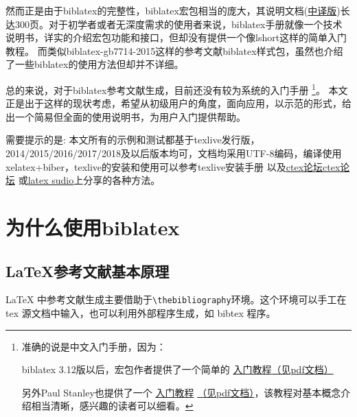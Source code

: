 \documentclass[twoside]{article} %
\begin{document}
然而正是由于biblatex的完整性，biblatex宏包相当的庞大，其说明文档(\href{https://github.com/hushidong/biblatex-zh-cn}{中译版})长达300页。对于初学者或者无深度需求的使用者来说，biblatex手册就像一个技术说明书，详实的介绍宏包功能和接口，但却没有提供一个像lshort这样的简单入门教程。
而类似biblatex-gb7714-2015这样的参考文献biblatex样式包\cite{胡振震2016}，虽然也介绍了一些biblatex的使用方法但却并不详细。%

总的来说，对于biblatex参考文献生成，目前还没有较为系统的入门手册
\footnote{准确的说是中文入门手册，因为：\par
biblatex 3.12版以后，宏包作者提供了一个简单的
\href{https://github.com/plk/biblatex/blob/dev/doc/latex/biblatex/biblatex-quickstart.tex}{入门教程}\href{run:exampleandimage/biblatex-quickstart.pdf}{（见pdf文档）}\par
另外Paul Stanley也提供了一个
\href{https://github.com/PaulStanley/biblatex-tutorial}{入门教程}
\href{https://github.com/hushidong/biblatex-tutorial-cn}{（见pdf文档）}，该教程对基本概念介绍相当清晰，感兴趣的读者可以细看。}。
本文正是出于这样的现状考虑，希望从初级用户的角度，面向应用，以示范的形式，给出一个简易但全面的使用说明书，为用户入门提供帮助。


需要提示的是: 本文所有的示例和测试都基于texlive发行版，2014/2015/2016/2017/2018及以后版本均可，文档均采用UTF-8编码，编译使用xelatex+biber，texlive的安装和使用可以参考texlive安装手册\cite{Berry2016--}
以及\href{http://bbs.ctex.org/forum.php}{ctex论坛ctex论坛}
或\href{http://www.latexstudio.net/}{latex sudio}上分享的各种方法。


\section{为什么使用biblatex}


\subsection{\LaTeX{}参考文献基本原理}\label{sec:latex:ref}

\LaTeX{} 中参考文献生成主要借助于\verb|\thebibliography|环境。这个环境可以手工在tex 源文档中输入，也可以利用外部程序生成，如 bibtex 程序。
\end{document}
